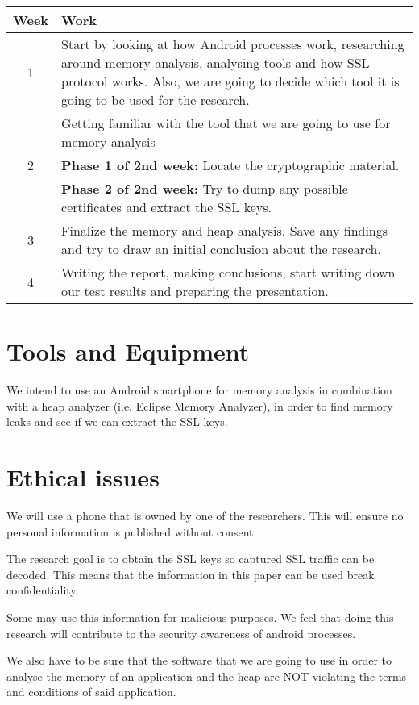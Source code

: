 \documentclass[11pt]{article}
\begin{document}
\begin{center}
\begin{tabular}{ | c | m{11cm}|  } 
\hline
Week & Work \\ 
\hline
1 & Start by looking at how Android processes work, researching around memory analysis, analysing tools and how SSL protocol works. Also, we are going to decide which tool it is going to be used for the research. \\ 
\hline
& Getting familiar with the tool that we are going to use for memory analysis\\
2 & \textbf{Phase 1 of 2nd week:} Locate the cryptographic material.\\
& \textbf{Phase 2 of 2nd week:} Try to dump any possible certificates and extract the SSL keys.\\ 
\hline
3 & Finalize the memory and heap analysis. Save any findings and try to draw an initial conclusion about the research.\\ 
\hline
4 & Writing the report, making conclusions, start writing down our test results and preparing the presentation. \\
\hline
\end{tabular}
\end{center}

\clearpage

\section{Tools and Equipment}
We intend to use an Android smartphone for memory analysis in combination with a heap analyzer (i.e. Eclipse Memory Analyzer), in order to find memory leaks and see if we can extract the SSL keys. 

\section{Ethical issues}
We will use a phone that is owned by one of the researchers. This will ensure no personal information is published without consent.

The research goal is to obtain the SSL keys so captured SSL traffic can be decoded. This means that the information in this paper can be used break confidentiality.

Some may use this information for malicious purposes. We feel that doing this research will contribute to the security awareness of android processes.

We also have to be sure that the software that we are going to use in order to analyse the memory of an application and the heap are NOT violating the terms and conditions of said application. 



\end{document}
